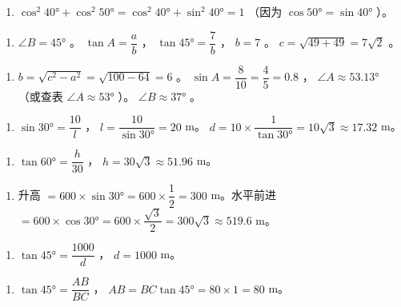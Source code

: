 \begin{answer}
\begin{enumerate}
  \item $\cos^2 40° + \cos^2 50° = \cos^2 40° + \sin^2 40° = 1$ （因为 $\cos 50° = \sin 40°$ ）。
\end{enumerate}


\begin{enumerate}
  \item $\angle B = 45°$ 。 $\tan A = \dfrac{a}{b}$ ， $\tan 45° = \dfrac{7}{b}$ ， $b = 7$ 。 $c = \sqrt{49 + 49} = 7\sqrt{2}$ 。
\end{enumerate}


\begin{enumerate}
  \item $b = \sqrt{c^2 - a^2} = \sqrt{100 - 64} = 6$ 。 $\sin A = \dfrac{8}{10} = \dfrac{4}{5} = 0.8$ ， $\angle A \approx 53.13°$ （或查表 $\angle A \approx 53°$ ）。 $\angle B \approx 37°$ 。
\end{enumerate}


\begin{enumerate}
  \item $\sin 30° = \dfrac{10}{l}$ ， $l = \dfrac{10}{\sin 30°} = 20$ m。 $d = 10 \times \dfrac{1}{\tan 30°} = 10\sqrt{3} \approx 17.32$ m。
\end{enumerate}


\begin{enumerate}
  \item $\tan 60° = \dfrac{h}{30}$ ， $h = 30\sqrt{3} \approx 51.96$ m。
\end{enumerate}


\begin{enumerate}
  \item 升高 $= 600 \times \sin 30° = 600 \times \dfrac{1}{2} = 300$ m。水平前进 $= 600 \times \cos 30° = 600 \times \dfrac{\sqrt{3}}{2} = 300\sqrt{3} \approx 519.6$ m。
\end{enumerate}


\begin{enumerate}
  \item $\tan 45° = \dfrac{1000}{d}$ ， $d = 1000$ m。
\end{enumerate}


\begin{enumerate}
  \item $\tan 45° = \dfrac{AB}{BC}$ ， $AB = BC \tan 45° = 80 \times 1 = 80$ m。
\end{enumerate}


\end{answer}
